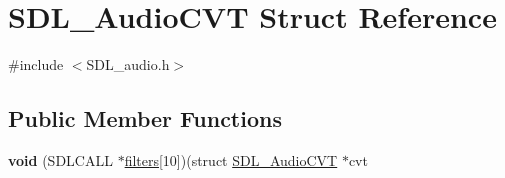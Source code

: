 \hypertarget{structSDL__AudioCVT}{\section{S\+D\+L\+\_\+\+Audio\+C\+V\+T Struct Reference}
\label{structSDL__AudioCVT}
}


{\ttfamily \#include $<$S\+D\+L\+\_\+audio.\+h$>$}

\subsection*{Public Member Functions}
\begin{DoxyCompactItemize}
\item 
\hypertarget{structSDL__AudioCVT_a289a571421d05e416dd585c6f890a75b}{{\bfseries void} (S\+D\+L\+C\+A\+L\+L $\ast$\hyperlink{structSDL__AudioCVT_aa9b3c25dcbfc957dd439a34fcd3ff608}{filters}\mbox{[}10\mbox{]})(struct \hyperlink{structSDL__AudioCVT}{S\+D\+L\+\_\+\+Audio\+C\+V\+T} $\ast$cvt}\label{structSDL__AudioCVT_a289a571421d05e416dd585c6f890a75b}

\end{DoxyCompactItemize}
